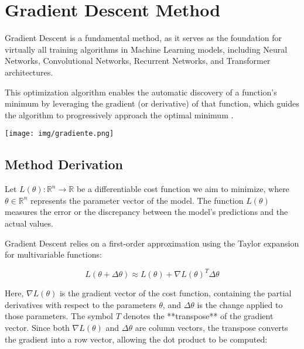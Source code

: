 \documentclass[12pt, letterpaper,conference]{IEEEtran}
\begin{document}
\vspace{0.5cm}


\section{Gradient Descent Method}

\vspace{0.25cm}

Gradient Descent is a fundamental method, as it serves as the foundation for virtually all training algorithms in Machine Learning models, including Neural Networks, Convolutional Networks, Recurrent Networks, and Transformer architectures.

This optimization algorithm enables the automatic discovery of a function’s minimum by leveraging the gradient (or derivative) of that function, which guides the algorithm to progressively approach the optimal minimum \cite{khan-descent}.

\vspace{0.3cm}

\texttt{[image: img/gradiente.png]}

\vspace{0.25cm}

\subsection{Method Derivation}

Let \( L(\theta): \mathbb{R}^n \rightarrow \mathbb{R} \) be a differentiable cost function we aim to minimize, where \( \theta \in \mathbb{R}^n \) represents the parameter vector of the model. The function \( L(\theta) \) measures the error or the discrepancy between the model’s predictions and the actual values.

Gradient Descent relies on a first-order approximation using the Taylor expansion for multivariable functions:

\[
L(\theta + \Delta \theta) \approx L(\theta) + \nabla L(\theta)^T \Delta \theta
\]

Here, \( \nabla L(\theta) \) is the gradient vector of the cost function, containing the partial derivatives with respect to the parameters \( \theta \), and \( \Delta \theta \) is the change applied to those parameters. The symbol \( T \) denotes the **transpose** of the gradient vector. Since both \( \nabla L(\theta) \) and \( \Delta \theta \) are column vectors, the transpose converts the gradient into a row vector, allowing the dot product to be computed:
\end{document}
